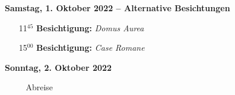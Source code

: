 \begin{description}


\item {\textbf{Samstag, 1. Oktober 2022 -- Alternative Besichtungen}}
\begin{itemize}
\item[11$^{45}$] {\textbf{Besichtigung:}}  {\emph{Domus Aurea}}	\\
\item[15$^{00}$] {\textbf{Besichtigung:}}  {\emph{Case Romane}}	
\end{itemize}


\item {\textbf{Sonntag, 2. Oktober 2022}}
\begin{itemize}
\item[~] Abreise
\end{itemize}


\end{description}